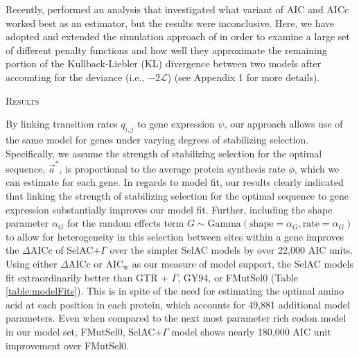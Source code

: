 \documentclass[12pt,letterpaper,fleqn]{article}
\renewcommand{\section}[1]{%
\bigskip
\begin{center}
\begin{Large}
\normalfont\scshape #1
\medskip
\end{Large}
\end{center}}
\newcommand{\DeltaAICc}{\ensuremath{\Delta\text{AICc}}\xspace}
\newcommand{\AICw}{\ensuremath{\text{AIC}_\text{w}}\xspace}
\newcommand{\Lik}{\ensuremath{\mathcal{L}}\xspace}%
\newcommand{\selac}{SelAC\xspace}
\newcommand{\selacplusgamma}{SelAC$+\Gamma$\xspace}
\newcommand{\alphag}{\ensuremath{\alpha_G}\xspace}
\newcommand{\aoptvec}{\ensuremath{\Vec{a}^*}\xspace}
\newcommand{\qij}{\ensuremath{q_{i,j}}\xspace}
\begin{document}
Recently, \citet{Jhwuengetal2014} performed an analysis that investigated what variant of AIC and AICc worked best as an estimator, but the results were inconclusive.
Here, we have adopted and extended the simulation approach of \citet{Jhwuengetal2014} in order to examine a large set of different penalty functions and how well they approximate the remaining portion of the Kullback-Liebler (KL) divergence between two models after accounting for the deviance (i.e., $-2\Lik$) (see Appendix 1 for more details).


\section{Results}
By linking transition rates $\qij$ to gene expression $\psi$, our approach allows use of the same model for genes under varying degrees of stabilizing selection.
Specifically, we assume the strength of stabilizing selection for the optimal sequence, \aoptvec, is proportional to the average protein synthesis rate $\phi$, which we can estimate for each gene.
In regards to model fit, our results clearly indicated that linking the strength of stabilizing selection for the optimal sequence to gene expression substantially improves our model fit.
Further, including the shape parameter \alphag for the random effects term $G \sim \text{Gamma}(\text{shape} = \alphag, \text{rate}=\alphag)$ to allow for heterogeneity in this selection between sites within a gene improves the \DeltaAICc of \selacplusgamma over the simpler \selac models by over 22,000 AIC units.
Using either \DeltaAICc or \AICw as our measure of model support, the \selac models fit extraordinarily better than GTR + $\Gamma$, GY94, or FMutSel0 (Table \ref{table:modelFits}).
This is in spite of the need for estimating the optimal amino acid at each position in each protein, which accounts for 49,881 additional model parameters.
Even when compared to the next most parameter rich codon model in our model set, FMutSel0, \selacplusgamma model shows nearly 180,000 AIC unit improvement over FMutSel0.
\end{document}
